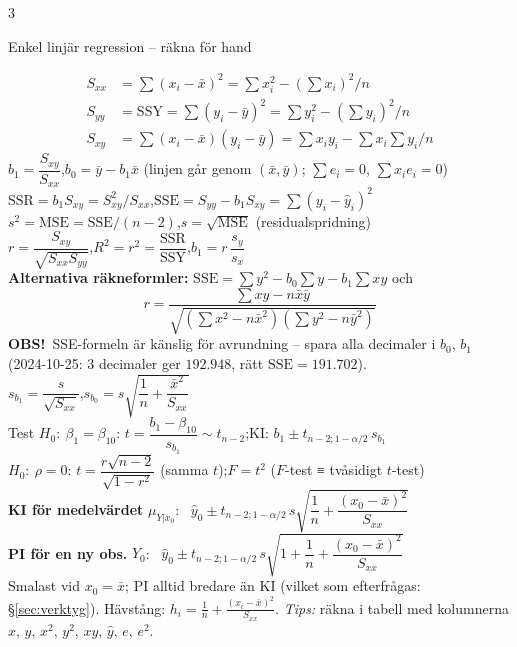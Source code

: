 \documentclass[8pt]{extarticle}
\makeatletter
\newcounter{sect}
\newcommand{\sect}[3][hd]{\par\vspace{1.5pt}\refstepcounter{sect}\noindent
  {\setlength{\fboxsep}{1.8pt}\colorbox{#1}{\parbox{\dimexpr\linewidth-2\fboxsep}{\color{white}\sffamily\bfseries
  \strut\thesect\enspace #2}}}\label{#3}\par\nobreak\vspace{0.8pt}\@afterheading}
\newcommand{\obs}{{\color{BrickRed}\sffamily\bfseries OBS!}\ }
\newcommand{\SSE}{\mathrm{SSE}}
\newcommand{\SSR}{\mathrm{SSR}}
\newcommand{\SSY}{\mathrm{SSY}}
\newcommand{\MSE}{\mathrm{MSE}}
\newenvironment{figrad}{\par\vspace{1.5pt}\centering}{\par\vspace{1.5pt}}%
\makeatother
\begin{document}
\begin{multicols*}{3}
\sect[cRakna]{Enkel linjär regression – räkna för hand}{sec:slr}
\vspace{-3pt}
\begin{align*}
S_{xx}&=\textstyle\sum(x_i-\bar x)^2=\sum x_i^2-(\sum x_i)^2/n\\
S_{yy}&=\SSY=\textstyle\sum(y_i-\bar y)^2=\sum y_i^2-(\sum y_i)^2/n\\
S_{xy}&=\textstyle\sum(x_i-\bar x)(y_i-\bar y)=\sum x_iy_i-\sum x_i\sum y_i/n
\end{align*}
$b_1=\dfrac{S_{xy}}{S_{xx}}$,\quad $b_0=\bar y-b_1\bar x$ \quad (linjen går genom $(\bar x,\bar y)$; $\sum e_i=0$, $\sum x_ie_i=0$)\\[1pt]
$\SSR=b_1S_{xy}=S_{xy}^2/S_{xx}$,\quad $\SSE=S_{yy}-b_1S_{xy}=\sum(y_i-\hat y_i)^2$\\
$s^2=\MSE=\SSE/(n-2)$,\quad $s=\sqrt{\MSE}$ (residualspridning)\\
$r=\dfrac{S_{xy}}{\sqrt{S_{xx}S_{yy}}}$,\quad $R^2=r^2=\dfrac{\SSR}{\SSY}$,\quad $b_1=r\,\dfrac{s_y}{s_x}$\\[1pt]
\textbf{Alternativa räkneformler:} $\SSE=\sum y^2-b_0\sum y-b_1\sum xy$ och
\[r=\frac{\sum xy-n\bar x\bar y}{\sqrt{(\sum x^2-n\bar x^2)(\sum y^2-n\bar y^2)}}\]
\obs SSE-formeln är känslig för avrundning – spara alla decimaler i $b_0$, $b_1$ (2024-10-25: 3 decimaler ger $192.948$, rätt $\SSE=191.702$).\\[1pt]
$s_{b_1}=\dfrac{s}{\sqrt{S_{xx}}}$,\quad $s_{b_0}=s\sqrt{\dfrac1n+\dfrac{\bar x^2}{S_{xx}}}$\\[1pt]
Test $H_0{:}\ \beta_1=\beta_{10}$: $t=\dfrac{b_1-\beta_{10}}{s_{b_1}}\sim t_{n-2}$;\quad KI: $b_1\pm t_{n-2;1-\alpha/2}\,s_{b_1}$\\[1pt]
$H_0{:}\ \rho=0$: $t=\dfrac{r\sqrt{n-2}}{\sqrt{1-r^2}}$ (samma $t$);\quad $F=t^2$ ($F$-test ≡ tvåsidigt $t$-test)\\[1pt]
\textbf{KI för medelvärdet} $\mu_{Y|x_0}$: \ $\hat y_0\pm t_{n-2;1-\alpha/2}\, s\sqrt{\dfrac1n+\dfrac{(x_0-\bar x)^2}{S_{xx}}}$\\[1pt]
\textbf{PI för en ny obs.} $Y_0$: \ $\hat y_0\pm t_{n-2;1-\alpha/2}\, s\sqrt{1+\dfrac1n+\dfrac{(x_0-\bar x)^2}{S_{xx}}}$\\[1pt]
Smalast vid $x_0=\bar x$; PI alltid bredare än KI (vilket som efterfrågas: §\ref{sec:verktyg}). Hävstång: $h_i=\frac1n+\frac{(x_i-\bar x)^2}{S_{xx}}$.
\emph{Tips:} räkna i tabell med kolumnerna $x,\,y,\,x^2,\,y^2,\,xy,\,\hat y,\,e,\,e^2$.
\begin{figrad}

\end{figrad}
\end{multicols*}
\end{document}
